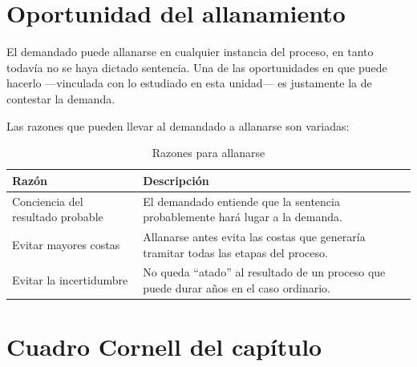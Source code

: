 \documentclass[12pt,oneside]{book}
\begin{document}
\section{Oportunidad del allanamiento}

El demandado puede allanarse en cualquier instancia del proceso, en tanto todavía no se haya dictado sentencia. Una de las oportunidades en que puede hacerlo —vinculada con lo estudiado en esta unidad— es justamente la de contestar la demanda.

Las razones que pueden llevar al demandado a allanarse son variadas:

\begin{table}[H]
\centering
\caption{Razones para allanarse}
\begin{tabularx}{\textwidth}{p{} X}
\toprule
\textbf{Razón} & \textbf{Descripción} \\
\midrule
Conciencia del resultado probable & El demandado entiende que la sentencia probablemente hará lugar a la demanda. \\
Evitar mayores costas & Allanarse antes evita las costas que generaría tramitar todas las etapas del proceso. \\
Evitar la incertidumbre & No queda ``atado'' al resultado de un proceso que puede durar años en el caso ordinario. \\
\bottomrule
\end{tabularx}
\end{table}

\section*{Cuadro Cornell del capítulo}
\end{document}
